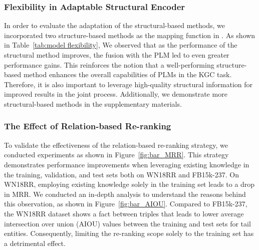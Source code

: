 \documentclass[11pt]{article}
\begin{document}
\begin{table}[!htbp]
	\centering
        \caption{
        Results on FB15k-237 with three map functions for the structural encoder.  means unifying PLM for training, while  means only using the structural encoder for training.  denotes the Hadamard product.
        }
        \vspace{-10pt}
        \label{tab:model flexibility} 
\end{table}

\subsubsection{Flexibility in Adaptable Structural Encoder}

In order to evaluate the adaptation of the structural-based methods, we incorporated two structure-based methods as the mapping function in . As shown in Table~\ref{tab:model flexibility}, We observed that as the performance of the structural method improves, the fusion with the PLM led to even greater performance gains. This reinforces the notion that a well-performing structure-based method enhances the overall capabilities of PLMs in the KGC task. Therefore, it is also important to leverage high-quality structural information for improved results in the joint process. Additionally, we demonstrate more structural-based methods in the supplementary materials.

\subsubsection{The Effect of Relation-based Re-ranking}

To validate the effectiveness of the relation-based re-ranking strategy, we conducted experiments as shown in Figure~\ref{fig:bar_MRR}. This strategy demonstrates performance improvements when leveraging existing knowledge in the training, validation, and test sets both on WN18RR and FB15k-237. On WN18RR, employing existing knowledge solely in the training set leads to a drop in MRR. We conducted an in-depth analysis to understand the reasons behind this observation, as shown in Figure~\ref{fig:bar_AIOU}. Compared to FB15k-237, the WN18RR dataset shows a fact between triples that leads to lower average intersection over union (AIOU) values between the training and test sets for tail entities. Consequently, limiting the re-ranking scope solely to the training set has a detrimental effect.
\end{document}
